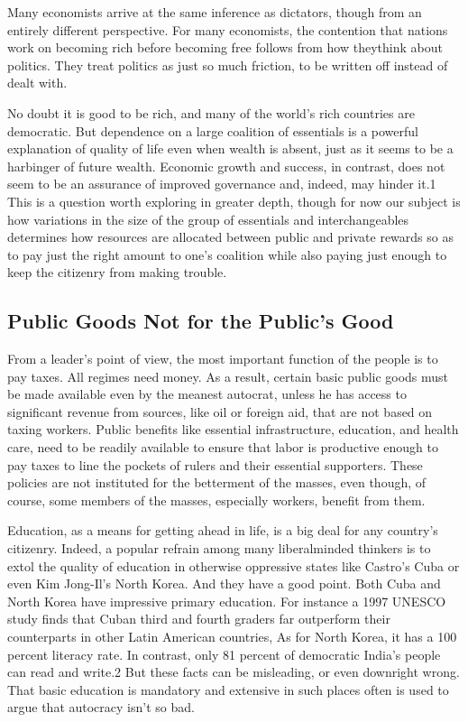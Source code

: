 \documentclass[10pt]{article}
\begin{document}
{\large Many economists arrive at the same inference as dictators, though from
an entirely different perspective. For many economists, the contention that
nations work on becoming rich before becoming free follows from how theythink
about politics. They treat politics as just so much friction, to be written off
instead of dealt with.}

{\large No doubt it is good to be rich, and many of the world's rich countries
are democratic. But dependence on a large coalition of essentials is a powerful
explanation of quality of life even when wealth is absent, just as it seems to be
a harbinger of future wealth. Economic growth and success, in contrast, does not
seem to be an assurance of improved governance and, indeed, may hinder it.1 This
is a question worth exploring in greater depth, though for now our subject is how
variations in the size of the group of essentials and interchangeables determines
how resources are allocated between public and private rewards so as to pay just
the right amount to one's coalition while also paying just enough to keep the
citizenry from making trouble.}

\subsection{Public Goods Not for the Public's Good}

{\large From a leader's point of view, the most important function of the people
is to pay taxes. All regimes need money. As a result, certain basic public goods
must be made available even by the meanest autocrat, unless he has access to
significant revenue from sources, like oil or foreign aid, that are not based on
taxing workers. Public benefits like essential infrastructure, education, and
health care, need to be readily available to ensure that labor is productive
enough to pay taxes to line the pockets of rulers and their essential supporters.
These policies are not instituted for the betterment of the masses, even though,
of course, some members of the masses, especially workers, benefit from them.}

{\large Education, as a means for getting ahead in life, is a big deal for any
country's citizenry. Indeed, a popular refrain among many liberalminded thinkers
is to extol the quality of education in otherwise oppressive states like Castro's
Cuba or even Kim Jong-Il's North Korea. And they have a good point. Both Cuba and
North Korea have impressive primary education. For instance a 1997 UNESCO study
finds that Cuban third and fourth graders far outperform their counterparts in
other Latin American countries, As for North Korea, it has a 100 percent literacy
rate. In contrast, only 81 percent of democratic India's people can read and
write.2 But these facts can be misleading, or even downright wrong. That basic
education is mandatory and extensive in such places often is used to argue that
autocracy isn't so bad.}
\end{document}
